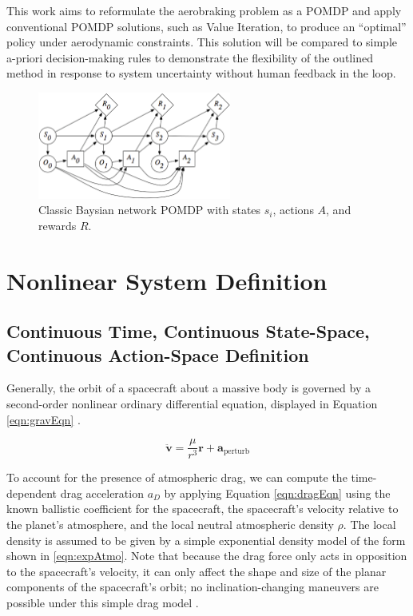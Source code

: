 \documentclass[paper,11pt]{AAS}		%
\begin{document}
This work aims to reformulate the aerobraking problem as a POMDP and apply conventional POMDP solutions, such as Value 
Iteration, to produce an ``optimal'' policy under aerodynamic constraints. This solution will be compared to simple a-priori 
decision-making rules to demonstrate the flexibility of the outlined method in response to system uncertainty without human 
feedback in the loop.

\begin{figure}[!b]
	\centering
	\includegraphics[width=2.5in]{classicalPOMDP.png}
	\caption{Classic Baysian network POMDP with states $s_i$, actions $A$, and rewards $R$. }
	\label{fig:classicalPOMDP}
\end{figure}

\section{Nonlinear System Definition}
\subsection{Continuous Time, Continuous State-Space, Continuous Action-Space Definition}

Generally, the orbit of a spacecraft about a massive body is governed by a second-order nonlinear ordinary differential 
equation, displayed in Equation \ref{eqn:gravEqn} \cite{Vallado2013}. 

\begin{equation}
\ddot{\mathbf{v}} = \frac{\mu}{r^3} \mathbf{r} + \mathbf{a}_{\text{perturb}}
\label{eqn:gravEqn}
\end{equation}

To account for the presence of atmospheric drag, we can compute the time-dependent drag acceleration $a_D$ by applying Equation 
\ref{eqn:dragEqn} \cite{Vallado2013} using the known ballistic coefficient for the spacecraft, the spacecraft's velocity 
relative to the planet's atmosphere, and the local neutral atmospheric density $\rho$. The local density is assumed to be given 
by a simple exponential density model of the form shown in \ref{eqn:expAtmo}. Note that because the drag force only acts in 
opposition to the spacecraft's velocity, it can only affect the shape and size of the planar components of the spacecraft's 
orbit; no inclination-changing maneuvers are possible under this simple drag model \cite{Sutton2008}.
\end{document}
